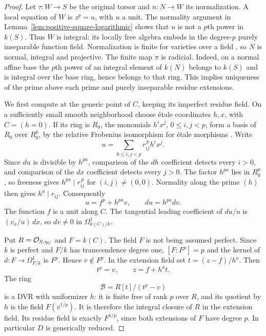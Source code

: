 \begin{proof}
Let $\tau:W\to S$ be the original torsor and $n:N\to W$ its
normalization. A local equation of $W$ is $z^p=u$, with $u$ a unit.
The normality argument in
Lemma~\ref{lem:positive-square-logarithmic} shows that $u$ is not a
$p$th power in $k(S)$. Thus $W$ is integral: its locally free
algebra embeds in the degree-$p$ purely inseparable function field.
Normalization is finite for varieties over a field
\cite[Tag~0BXR]{Stacks}, so $N$ is normal, integral and projective.
The finite map $\pi$ is radicial. Indeed, on a normal affine base
the $p$th power of an integral element of $k(N)$ belongs to $k(S)$
and is integral over the base ring, hence belongs to that ring.
This implies uniqueness of the prime above each prime and purely
inseparable residue extensions.

We first compute at the generic point of $C$, keeping its imperfect
residue field. On a sufficiently small smooth neighborhood choose
\'etale coordinates $h,x$, with $C=(h=0)$. If its ring is $R_0$,
the monomials $h^ix^j$, $0\leq i,j<p$, form a basis of $R_0$
over $R_0^p$, by the relative Frobenius isomorphism for \'etale
morphisms \cite[Tag~0EBS]{Stacks}. Write
\[
 u=\sum_{0\leq i,j<p}r_{ij}^{\,p}h^ix^j.
\]
Since $du$ is divisible by $h^{pa}$, comparison of the $dh$
coefficient detects every $i>0$, and comparison of the $dx$
coefficient detects every $j>0$. The factor $h^{pa}$ lies in
$R_0^p$, so freeness gives
$h^{pa}\mid r_{ij}^{\,p}$ for $(i,j)\ne(0,0)$.
Normality along the prime $(h)$ then gives $h^a\mid r_{ij}$.
Consequently
\begin{equation}\label{eq:positive-square-local-root}
 u=f^p+h^{pa}v,\qquad du=h^{pa}dv.
\end{equation}
The function $f$ is a unit along $C$. The tangential leading
coefficient of $du/u$ is $(v_x/u)\,dx$, so
$d\overline v\ne0$ in $\Omega^1_{k(C)/k}$.

Put $R=\mathcal O_{S,\eta_C}$ and $F=k(C)$. The field $F$ is not being
assumed perfect. Since $k$ is perfect and $F/k$ has transcendence
degree one, $[F:F^p]=p$ and the kernel of
$d:F\to\Omega^1_{F/k}$ is $F^p$. Hence $\overline v\notin F^p$.
In the extension field set $t=(z-f)/h^a$. Then
\[
 t^p=v,\qquad z=f+h^at.
\]
The ring
\[
 \mathcal B=R[t]/(t^p-v)
\]
is a DVR with uniformizer $h$: it is finite free of rank $p$ over
$R$, and its quotient by $h$ is the field
$F(\overline v^{1/p})$. It is therefore the integral closure of
$R$ in the extension field. Its residue field is exactly
$F^{1/p}$, since both extensions of $F$ have degree $p$.
In particular $D$ is generically reduced.


\end{proof}
